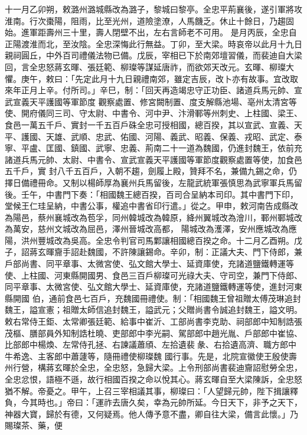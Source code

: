 \begin{pinyinscope}
 十一月乙卯朔，敕潞州潞城縣改為潞子，黎城曰黎亭。全忠平荊襄後，遂引軍將攻淮南。行次棗陽，阻雨，比至光州，道險塗潦，人馬饑乏。休止十餘日，乃趨固始。進軍距壽州三十里，壽人閉壁不出，左右言師老不可用。
 是月丙辰，全忠自正陽渡淮而北，至汝陰。全忠深悔此行無益。丁卯，至大梁。時哀帝以此月十九日親祠圓丘，中外百司禮儀法物已備。戊辰，宰相已下於南郊壇習儀，而裴迪自大梁回，言全忠怒蔣玄暉、張廷範、柳璨等謀延唐祚，而欲郊天改元。玄暉、柳璨大懼。庚午，敕曰：「先定此月十九日親禮南郊，雖定吉辰，改卜亦有故事。宜改取來年正月上辛。付所司。」辛巳，制：「回天再造竭忠守正功臣、諸道兵馬元帥、宣武宣義天平護國等軍節度
 觀察處置、修宮闕制置、度支解縣池場、亳州太清宮等使、開府儀同三司、守太尉、中書令、河中尹、汴滑鄆等州刺史、上柱國、梁王、食邑一萬五千戶、實封一千五百戶硃全忠可授相國，總百揆，其以宣武、宣義、天平、護國、天雄、武順、忠武、佑國、河陽、義武、昭義、保義、戎昭、武定、泰寧、平盧、匡國、鎮國、武寧、忠義、荊南二十一道為魏國，仍進封魏王，依前充諸道兵馬元帥、太尉、中書令、宣武宣義天平護國等軍節度觀察處置等使，加食邑五千戶，實
 封八千五百戶，入朝不趨，劍履上殿，贊拜不名，兼備九錫之命，仍擇日備禮冊命。又制以楊師厚為襄州兵馬留後，左龍武統軍張慎思為武寧軍兵馬留後。壬午，中書門下奏：「相國魏王總百揆，百司合呈納本司印。其中書門下印，堂候王仁珪呈納，中書公事，權追中書省印行遣。」從之。甲申，敕河南告成縣改為陽邑，蔡州襄城改為苞孚，同州韓城改為韓原，絳州翼城改為澮川，鄆州鄆城改為萬安，慈州文城改為屈邑，澤州晉城改高都，
 陽城改為濩澤，安州應城改為應陽，洪州豐城改為吳高。全忠令判官司馬鄴讓相國總百揆之命。十二月乙酉朔。戊子，詔蔣玄暉齎手詔赴魏國，不許陳讓錫命。辛卯，制：正議大夫、門下侍郎，兼戶部尚書、同平章事、太微宮使、弘文館大學士、延資庫使，充諸道鹽鐵轉運等使、上柱國、河東縣開國男、食邑三百戶柳璨可光祿大夫、守司空，兼門下侍郎、同平章事、太微宮使、弘文館大學士、延資庫使，充諸道鹽鐵轉運等使，進封河東縣開國
 伯，通前食邑七百戶，充魏國冊禮使。制：「相國魏王曾祖贈太傅茂琳追封魏王，謚宣憲；祖贈太師信追封魏王，謚武元；父贈尚書令誠追封魏王，謚文明。敕右常侍王鉅、太常卿張廷範、給事中崔沂、工部尚書李克助、祠部郎中知制誥張茂樞、膳部員外知制誥杜曉、吏部郎中李光嗣、駕部郎中趙光胤、戶部郎中崔協、比部郎中楊煥、左常侍孔拯、右諫議蕭頎、左拾遺裴彖、右拾遺高濟、職方郎中牛希逸、主客郎中蕭蘧等，隨冊禮使柳璨魏
 國行事。先是，北院宣徽使王殷使壽州行營，構蔣玄暉於全忠，全忠怒，急歸大梁。上令刑部尚書裴迪齎詔慰勞全忠，全忠忿恨，語極不遜，故行相國百揆之命以悅其心。蔣玄暉自至大梁陳訴，全忠怒猶不解。帝憂之。甲午，上召三宰相議其事，柳璨曰：「人望歸元帥，陛下揖讓釋負，今其時也。」帝曰：「運祚去唐久矣，幸為元帥所延。今日天下，非予之天下，神器大寶，歸於有德，又何疑焉。他人傳予意不盡，卿自往大梁，備言此懷。」乃賜璨茶、藥，便

\end{pinyinscope}
